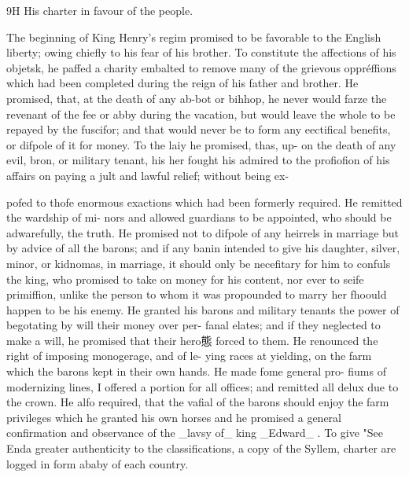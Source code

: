\documentclass{article}
\begin{document}
9H His charter in favour of the people.

The beginning of King Henry's regim promised to be favorable to the English liberty; owing chiefly to his fear of his brother. To constitute the affections of his objetsk, he paffed a charity embalted to remove many of the grievous oppréffions which had been completed during the reign of his father and brother. He promised, that, at the death of any ab-bot or bihhop, he never would farze the revenant of the fee or abby during the vacation, but would leave the whole to be repayed by the fuscifor; and that would never be to form any eectifical benefits, or difpole of it for money. To the laiy he promised, thas, up- on the death of any evil, bron, or military tenant, his her fought his admired to the profiofion of his affairs on paying a jult and lawful relief; without being ex-

pofed to thofe enormous exactions which had been formerly required. He remitted the wardship of mi- nors and allowed guardians to be appointed, who should be adwarefully, the truth. He promised not to difpole of any heirrels in marriage but by advice of all the barons; and if any banin intended to give his daughter, silver, minor, or kidnomas, in marriage, it should only be necefitary for him to confuls the king, who promised to take on money for his content, nor ever to seife primiffion, unlike the person to whom it was propounded to marry her fhoould happen to be his enemy. He granted his barons and military tenants the power of begotating by will their money over per- fanal elates; and if they neglected to make a will, he promised that their hero態 forced to them. He renounced the right of imposing monogerage, and of le- ying races at yielding, on the farm which the barons kept in their own hands. He made fome general pro- fiums of modernizing lines, I offered a portion for all offices; and remitted all delux due to the crown. He alfo required, that the vafial of the barons should enjoy the farm privileges which he granted his own horses and he promised a general confirmation and observance of the \_lavsy of\_ king \_Edward\_ . To give "See Enda greater authenticity to the classifications, a copy of the Syllem, charter are logged in form ababy of each country.
\end{document}
